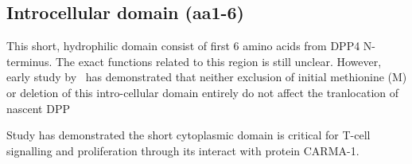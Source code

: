 \subsection{Introcellular domain (aa1-6)}

This short, hydrophilic domain consist of first 6 amino acids from DPP4 N-terminus. The exact functions related to this region is still unclear. However, early study by~\citet{Hong1990} has demonstrated that neither exclusion of initial methionine (M) or deletion of this intro-cellular domain entirely do not affect the tranlocation of nascent DPP

Study has demonstrated the short cytoplasmic domain is critical for T-cell signalling and proliferation through its interact with protein CARMA-1. \cite{Ohnuma_2007}